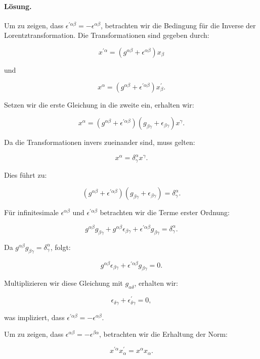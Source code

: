 \documentclass[11pt,a4paper]{article}
\begin{document}
\paragraph{Lösung.}
Um zu zeigen, dass $\epsilon^{\prime \alpha \beta} = - \epsilon^{\alpha \beta}$, betrachten wir die Bedingung für die Inverse der Lorentztransformation. Die Transformationen sind gegeben durch:

\[
x^{\prime \alpha} = \left(g^{\alpha \beta} + \epsilon^{\alpha \beta}\right) x_\beta
\]

und

\[
x^\alpha = \left(g^{\alpha \beta} + \epsilon^{\prime \alpha \beta}\right) x_\beta^{\prime}.
\]

Setzen wir die erste Gleichung in die zweite ein, erhalten wir:

\[
x^\alpha = \left(g^{\alpha \beta} + \epsilon^{\prime \alpha \beta}\right) \left(g_{\beta \gamma} + \epsilon_{\beta \gamma}\right) x^\gamma.
\]

Da die Transformationen invers zueinander sind, muss gelten:

\[
x^\alpha = \delta^\alpha_\gamma x^\gamma.
\]

Dies führt zu:

\[
\left(g^{\alpha \beta} + \epsilon^{\prime \alpha \beta}\right) \left(g_{\beta \gamma} + \epsilon_{\beta \gamma}\right) = \delta^\alpha_\gamma.
\]

Für infinitesimale $\epsilon^{\alpha \beta}$ und $\epsilon^{\prime \alpha \beta}$ betrachten wir die Terme erster Ordnung:

\[
g^{\alpha \beta} g_{\beta \gamma} + g^{\alpha \beta} \epsilon_{\beta \gamma} + \epsilon^{\prime \alpha \beta} g_{\beta \gamma} = \delta^\alpha_\gamma.
\]

Da $g^{\alpha \beta} g_{\beta \gamma} = \delta^\alpha_\gamma$, folgt:

\[
g^{\alpha \beta} \epsilon_{\beta \gamma} + \epsilon^{\prime \alpha \beta} g_{\beta \gamma} = 0.
\]

Multiplizieren wir diese Gleichung mit $g_{\alpha \delta}$, erhalten wir:

\[
\epsilon_{\delta \gamma} + \epsilon^{\prime}_{\delta \gamma} = 0,
\]

was impliziert, dass $\epsilon^{\prime \alpha \beta} = - \epsilon^{\alpha \beta}$.

Um zu zeigen, dass $\epsilon^{\alpha \beta} = -\epsilon^{\beta \alpha}$, betrachten wir die Erhaltung der Norm:

\[
x^{\prime \alpha} x^{\prime}_\alpha = x^\alpha x_\alpha.
\]
\end{document}
